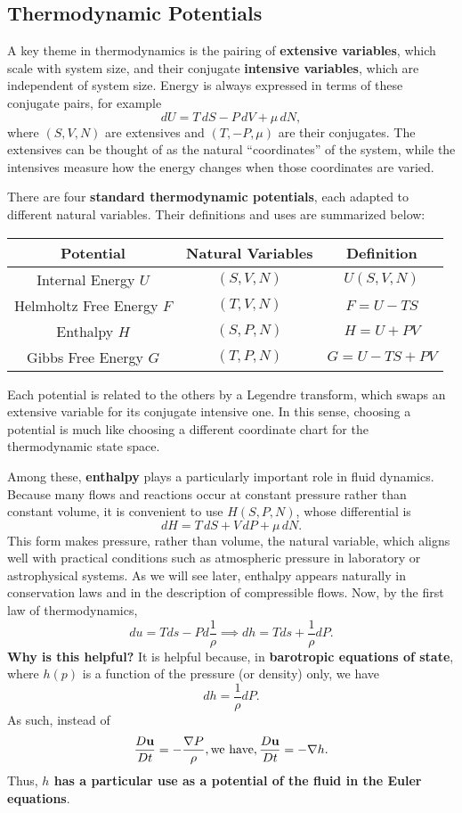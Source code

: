 \subsection{Thermodynamic Potentials}

A key theme in thermodynamics is the pairing of \textbf{extensive variables}, which scale with system size, and their conjugate \textbf{intensive variables}, which are independent of system size. Energy is always expressed in terms of these conjugate pairs, for example
\[
dU = T\,dS - P\,dV + \mu\, dN,
\]
where $(S,V,N)$ are extensives and $(T,-P,\mu)$ are their conjugates. The extensives can be thought of as the natural ``coordinates'' of the system, while the intensives measure how the energy changes when those coordinates are varied.

\medskip
There are four \textbf{standard thermodynamic potentials}, each adapted to different natural variables. Their definitions and uses are summarized below:

\begin{center}
\begin{tabular}{c|c|c}
Potential & Natural Variables & Definition \\
\hline
Internal Energy $U$ & $(S,V,N)$ & $U(S,V,N)$ \\
Helmholtz Free Energy $F$ & $(T,V,N)$ & $F = U - TS$ \\
Enthalpy $H$ & $(S,P,N)$ & $H = U + PV$ \\
Gibbs Free Energy $G$ & $(T,P,N)$ & $G = U - TS + PV$ \\
\end{tabular}
\end{center}

Each potential is related to the others by a Legendre transform, which swaps an extensive variable for its conjugate intensive one. In this sense, choosing a potential is much like choosing a different coordinate chart for the thermodynamic state space.

\medskip
Among these, \textbf{enthalpy} plays a particularly important role in fluid dynamics. Because many flows and reactions occur at constant pressure rather than constant volume, it is convenient to use $H(S,P,N)$, whose differential is
\[
dH = T\,dS + V\,dP + \mu\, dN.
\]
This form makes pressure, rather than volume, the natural variable, which aligns well with practical conditions such as atmospheric pressure in laboratory or astrophysical systems. As we will see later, enthalpy appears naturally in conservation laws and in the description of compressible flows.
Now, by the first law of thermodynamics,
\[
du = Tds - P d\frac{1}{\rho} \implies \boxed{dh = Tds + \frac{1}{\rho} dP}.
\]
\textbf{Why is this helpful?} It is helpful because, in \textbf{barotropic equations of state}, where $h(p)$ is a function of the pressure (or density) only, we have 
\[
dh = \frac{1}{\rho} dP.
\]
 As such, instead of
\[
\frac{D{\bf u}}{Dt} = - \frac{\nabla P}{\rho}, \text{we have}, \frac{D{\bf u}}{Dt} = - \nabla h.
\]
Thus, \textbf{$h$ has a particular use as a potential of the fluid in the Euler equations}.



